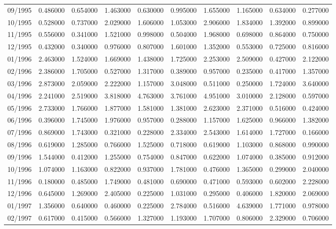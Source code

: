 \begin{tabular}{lrrrrrrrrr}
09/1995 & 0.486000 & 0.654000 & 1.463000 & 0.630000 & 0.995000 & 1.655000 & 1.165000 & 0.634000 & 0.277000 \\
10/1995 & 0.528000 & 0.737000 & 2.029000 & 1.606000 & 1.053000 & 2.906000 & 1.834000 & 1.392000 & 0.899000 \\
11/1995 & 0.556000 & 0.341000 & 1.521000 & 0.998000 & 0.504000 & 1.968000 & 0.698000 & 0.864000 & 0.750000 \\
12/1995 & 0.432000 & 0.340000 & 0.976000 & 0.807000 & 1.601000 & 1.352000 & 0.553000 & 0.725000 & 0.816000 \\
01/1996 & 2.463000 & 1.524000 & 1.669000 & 1.438000 & 1.725000 & 2.253000 & 2.509000 & 0.427000 & 2.122000 \\
02/1996 & 2.386000 & 1.705000 & 0.527000 & 1.317000 & 0.389000 & 0.957000 & 0.235000 & 0.417000 & 1.357000 \\
03/1996 & 2.873000 & 2.059000 & 2.222000 & 1.157000 & 3.048000 & 0.511000 & 0.250000 & 1.724000 & 3.640000 \\
04/1996 & 2.241000 & 2.519000 & 3.818000 & 4.763000 & 3.761000 & 4.951000 & 3.010000 & 2.128000 & 0.597000 \\
05/1996 & 2.733000 & 1.766000 & 1.877000 & 1.581000 & 1.381000 & 2.623000 & 2.371000 & 0.516000 & 0.424000 \\
06/1996 & 0.396000 & 1.745000 & 1.976000 & 0.957000 & 0.288000 & 1.157000 & 1.625000 & 0.966000 & 1.382000 \\
07/1996 & 0.869000 & 1.743000 & 0.321000 & 0.228000 & 2.334000 & 2.543000 & 1.614000 & 1.727000 & 0.166000 \\
08/1996 & 0.619000 & 1.285000 & 0.766000 & 1.525000 & 0.718000 & 0.619000 & 1.103000 & 0.868000 & 0.990000 \\
09/1996 & 1.544000 & 0.412000 & 1.255000 & 0.754000 & 0.847000 & 0.622000 & 1.074000 & 0.385000 & 0.912000 \\
10/1996 & 1.074000 & 1.163000 & 0.822000 & 0.937000 & 1.781000 & 0.476000 & 1.365000 & 0.299000 & 2.040000 \\
11/1996 & 0.180000 & 0.485000 & 1.749000 & 0.481000 & 0.690000 & 0.471000 & 0.593000 & 0.602000 & 2.228000 \\
12/1996 & 0.645000 & 1.269000 & 2.405000 & 0.225000 & 1.031000 & 0.295000 & 0.406000 & 1.820000 & 2.069000 \\
01/1997 & 1.356000 & 0.640000 & 0.460000 & 0.225000 & 2.784000 & 0.516000 & 4.639000 & 1.771000 & 0.978000 \\
02/1997 & 0.617000 & 0.415000 & 0.566000 & 1.327000 & 1.193000 & 1.707000 & 0.806000 & 2.329000 & 0.706000 \\

\end{tabular}
